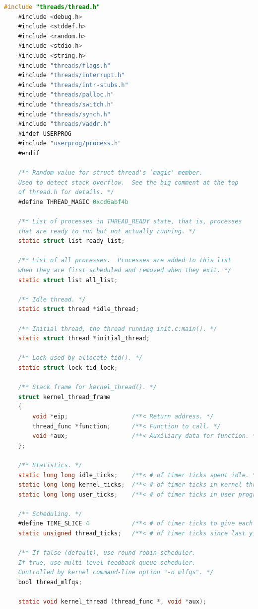 \documentclass{article}
\begin{document}
\begin{lstlisting}[language=C, title=\texttt{thread.c}]
	#include "threads/thread.h"
	#include <debug.h>
	#include <stddef.h>
	#include <random.h>
	#include <stdio.h>
	#include <string.h>
	#include "threads/flags.h"
	#include "threads/interrupt.h"
	#include "threads/intr-stubs.h"
	#include "threads/palloc.h"
	#include "threads/switch.h"
	#include "threads/synch.h"
	#include "threads/vaddr.h"
	#ifdef USERPROG
	#include "userprog/process.h"
	#endif
	
	/** Random value for struct thread's `magic' member.
	Used to detect stack overflow.  See the big comment at the top
	of thread.h for details. */
	#define THREAD_MAGIC 0xcd6abf4b
	
	/** List of processes in THREAD_READY state, that is, processes
	that are ready to run but not actually running. */
	static struct list ready_list;
	
	/** List of all processes.  Processes are added to this list
	when they are first scheduled and removed when they exit. */
	static struct list all_list;
	
	/** Idle thread. */
	static struct thread *idle_thread;
	
	/** Initial thread, the thread running init.c:main(). */
	static struct thread *initial_thread;
	
	/** Lock used by allocate_tid(). */
	static struct lock tid_lock;
	
	/** Stack frame for kernel_thread(). */
	struct kernel_thread_frame 
	{
		void *eip;                  /**< Return address. */
		thread_func *function;      /**< Function to call. */
		void *aux;                  /**< Auxiliary data for function. */
	};
	
	/** Statistics. */
	static long long idle_ticks;    /**< # of timer ticks spent idle. */
	static long long kernel_ticks;  /**< # of timer ticks in kernel threads. */
	static long long user_ticks;    /**< # of timer ticks in user programs. */
	
	/** Scheduling. */
	#define TIME_SLICE 4            /**< # of timer ticks to give each thread. */
	static unsigned thread_ticks;   /**< # of timer ticks since last yield. */
	
	/** If false (default), use round-robin scheduler.
	If true, use multi-level feedback queue scheduler.
	Controlled by kernel command-line option "-o mlfqs". */
	bool thread_mlfqs;
	
	static void kernel_thread (thread_func *, void *aux);
	

\end{lstlisting}
\end{document}
